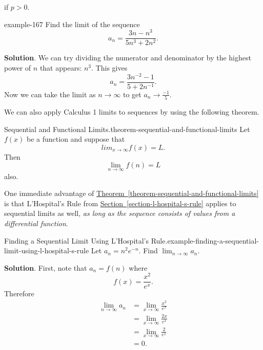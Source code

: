 \documentclass[10pt,]{book}
\numberwithin{equation}{section}
\newcommand{\amp}{&}
\begin{document}
if \(p > 0\).%
\begin{example}{}{example-167}%
\hypertarget{p-793}{}%
Find the limit of the sequence%
\begin{equation*}
a_{n} = \frac{3n - n^{3}}{5n^{3} + 2n^{2}}.
\end{equation*}
%
\par\smallskip%
\noindent\textbf{Solution}.\hypertarget{solution-163}{}\quad%
\hypertarget{p-794}{}%
We can try dividing the numerator and denominator by the highest power of \(n\) that appears: \(n^{3}\). This gives%
\begin{equation*}
a_{n} = \frac{3n^{-2} - 1}{5 + 2n^{-1}}\text{.}
\end{equation*}
Now we can take the limit as \(n\to\infty\) to get \(a_{n}\to\frac{-1}{5}\).%
\end{example}
\hypertarget{p-795}{}%
We can also apply Calculus 1 limits to sequences by using the following theorem.%
\begin{theorem}{Sequential and Functional Limits.}{}{theorem-sequential-and-functional-limits}%
\hypertarget{p-796}{}%
Let \(f(x)\) be a function and suppose that%
\begin{equation*}
lim_{x\to\infty}f(x) = L\text{.}
\end{equation*}
Then%
\begin{equation*}
\lim_{n\to\infty}f(n) = L
\end{equation*}
also.%
\end{theorem}
\hypertarget{p-797}{}%
One immediate advantage of \hyperref[theorem-sequential-and-functional-limits]{Theorem~\ref{theorem-sequential-and-functional-limits}} is that L'Hospital's Rule from \hyperref[section-l-hospital-s-rule]{Section~\ref{section-l-hospital-s-rule}} applies to sequential limits as well, \emph{as long as the sequence consists of values from a differential function}.%
\begin{example}{Finding a Sequential Limit Using L'Hospital's Rule.}{example-finding-a-sequential-limit-using-l-hospital-s-rule}%
\hypertarget{p-798}{}%
Let \(a_{n} = n^{2}e^{-n}\). Find \(\lim_{n\to\infty}a_{n}\).%
\par\smallskip%
\noindent\textbf{Solution}.\hypertarget{solution-164}{}\quad%
\hypertarget{p-799}{}%
First, note that \(a_{n} = f(n)\) where%
\begin{equation*}
f(x) = \frac{x^{2}}{e^{x}}\text{.}
\end{equation*}
Therefore%
%
\begin{align*}
\lim_{n\to\infty}a_{n} \amp = \lim_{x\to\infty}\frac{x^{2}}{e^{x}} \\
\amp = \lim_{x\to\infty}\frac{2x}{e^{x}} \\
\amp = \lim_{x\to\infty}\frac{2}{e^{x}} \\
\amp = 0 \text{.}
\end{align*}
\end{example}
\end{document}
